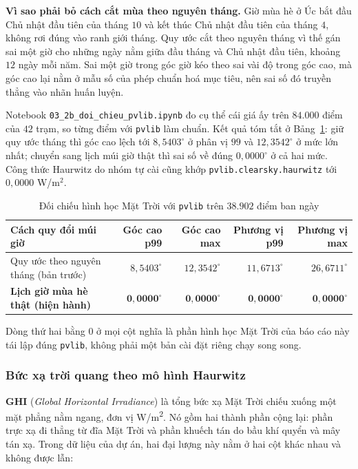 \textbf{Vì sao phải bỏ cách cắt mùa theo nguyên tháng.} Giờ mùa hè ở Úc bắt đầu Chủ nhật
đầu tiên của tháng $10$ và kết thúc Chủ nhật đầu tiên của tháng $4$, không rơi đúng vào
ranh giới tháng. Quy ước cắt theo nguyên tháng vì thế gán sai một giờ cho những ngày nằm
giữa đầu tháng và Chủ nhật đầu tiên, khoảng $12$ ngày mỗi năm. Sai một giờ trong góc giờ
kéo theo sai vài độ trong góc cao, mà góc cao lại nằm ở mẫu số của phép chuẩn hoá mục
tiêu, nên sai số đó truyền thẳng vào nhãn huấn luyện.

Notebook \texttt{03\_2b\_doi\_chieu\_pvlib.ipynb} đo cụ thể cái giá ấy trên $84.000$ điểm
của $42$ trạm, so từng điểm với \texttt{pvlib} làm chuẩn. Kết quả tóm tắt ở
Bảng~\ref{tab:doi_chieu_pvlib}: giữ quy ước tháng thì góc cao lệch tới $8{,}5403^\circ$ ở
phân vị $99$ và $12{,}3542^\circ$ ở mức lớn nhất; chuyển sang lịch múi giờ thật thì sai số
về đúng $0{,}0000^\circ$ ở cả hai mức. Công thức Haurwitz do nhóm tự cài cũng khớp
\texttt{pvlib.clearsky.haurwitz} tới $0{,}0000$ W/m$^2$.

\begin{table}[htbp]
\centering
\caption{Đối chiếu hình học Mặt Trời với \texttt{pvlib} trên $38.902$ điểm ban ngày}
\label{tab:doi_chieu_pvlib}
\small
\begin{tabular}{@{}l r r r r@{}}
\toprule
\textbf{Cách quy đổi múi giờ} & \textbf{Góc cao p99} & \textbf{Góc cao max} &
\textbf{Phương vị p99} & \textbf{Phương vị max} \\
\midrule
Quy ước theo nguyên tháng (bản trước) & $8{,}5403^\circ$ & $12{,}3542^\circ$ &
$11{,}6713^\circ$ & $26{,}6711^\circ$ \\
\textbf{Lịch giờ mùa hè thật (hiện hành)} & $\mathbf{0{,}0000^\circ}$ &
$\mathbf{0{,}0000^\circ}$ & $\mathbf{0{,}0000^\circ}$ & $\mathbf{0{,}0000^\circ}$ \\
\bottomrule
\end{tabular}


\end{table}

Dòng thứ hai bằng $0$ ở mọi cột nghĩa là phần hình học Mặt Trời của báo cáo này tái lập
đúng \texttt{pvlib}, không phải một bản cài đặt riêng chạy song song.

\subsubsection{Bức xạ trời quang theo mô hình Haurwitz}

\textbf{GHI} (\textit{Global Horizontal Irradiance}) là tổng bức xạ Mặt Trời chiếu
xuống một mặt phẳng nằm ngang, đơn vị W/m\textsuperscript{2}. Nó gồm hai thành phần cộng
lại: phần trực xạ đi thẳng từ đĩa Mặt Trời và phần khuếch tán do bầu khí quyển và mây tán
xạ. Trong dữ liệu của dự án, hai đại lượng này nằm ở hai cột khác nhau và không được
lẫn:

